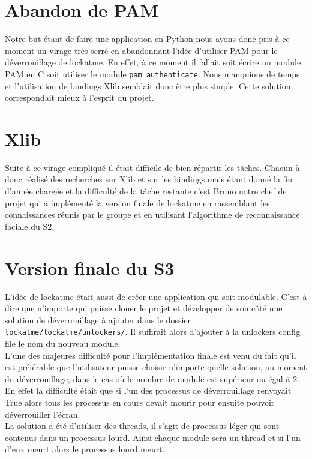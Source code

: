 \documentclass{article}
\begin{document}
  \section{Abandon de PAM}

  Notre but étant de faire une application en Python nous avons donc pris à ce
  moment un virage très serré en abandonnant l’idée d’utiliser PAM pour le
  déverrouillage de lockatme. En effet, à ce moment il fallait soit écrire un
  module PAM en C soit utiliser le module \texttt{pam\_authenticate}. Nous
  manquions de temps et l’utilisation de bindings Xlib semblait donc être plus
  simple. Cette solution correspondait mieux à l’esprit du
  projet.

  \section{Xlib}

  Suite à ce virage compliqué il était difficile de bien répartir les tâches.
  Chacun à donc réalisé des recherches sur Xlib et sur les bindings mais étant
  donné la fin d’année chargée et la difficulté de la tâche restante c’est
  Bruno notre chef de projet qui a implémenté la version finale de lockatme en
  rassemblant les connaissances réunis par le groupe et en utilisant
  l’algorithme de reconnaissance faciale du S2.

  \section{Version finale du S3}

  L’idée de lockatme était aussi de créer une application qui soit modulable.
  C’est à dire que n’importe qui puisse cloner le projet et développer de son
  côté une solution de déverrouillage à ajouter dans le dossier
  \verb|lockatme/lockatme/unlockers/|. Il suffirait alors d’ajouter à la
  unlockers config file le nom du nouveau module.
\\
  L’une des majeures difficulté pour l’implémentation finale est venu du fait
  qu’il est préférable que l’utilisateur puisse choisir n’importe quelle
  solution, au moment du déverrouillage, dans le cas où le nombre de module est
  supérieur ou égal à 2. En effet la difficulté était que si l’un des processus
  de déverrouillage renvoyait True alors tous les processus en cours devait
  mourir pour ensuite pouvoir déverrouiller l’écran.
\\
  La solution a été d’utiliser des threads, il s’agit de processus léger qui
  sont contenus dans un processus lourd. Ainsi chaque module sera un thread et
  si l’un d’eux meurt alors le processus lourd meurt.
\end{document}
